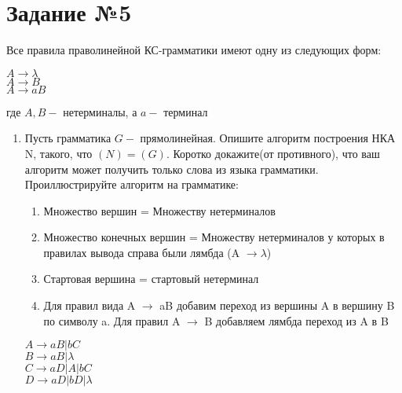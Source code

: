 \documentclass{article}
\begin{document}
    \section*{\huge{Задание №5}}
        \LARGE
        Все правила праволинейной КС-грамматики имеют одну из следующих форм:
        \begin{center}
            $A \rightarrow \lambda $ \\
            $A \rightarrow B$ \\
            $A \rightarrow aB$ \\
        \end{center}
        где $A,B - $ нетерминалы, а $a - $ терминал \\
        \begin{enumerate}
            \item Пусть грамматика $G - $ прямолинейная. Опишите алгоритм построения НКА  N, такого, что $(N) = (G)$.
            Коротко докажите(от противного), что ваш алгоритм может получить только слова из языка грамматики. Проиллюстрируйте алгоритм на грамматике: \\
           \begin{enumerate}
                \item Множество вершин = Множеству нетерминалов \\
                \item Множество конечных вершин = Множеству  нетерминалов у которых в правилах вывода справа были лямбда (A $\rightarrow \lambda$) \\
                \item Стартовая вершина = стартовый нетерминал \\
                \item Для правил вида A $\rightarrow$ aB добавим переход из вершины A в вершину B по символу a. Для правил A $\rightarrow$ B добавляем лямбда переход из A в B
            \end{enumerate}
            \begin{center}
                    $A \rightarrow aB|bC$ \\
                    $B \rightarrow aB|\lambda$ \\
                    $C \rightarrow aD|A|bC$ \\
                    $D \rightarrow aD|bD|\lambda$ \\
                \end{center}
        \end{enumerate}
    
\end{document}
